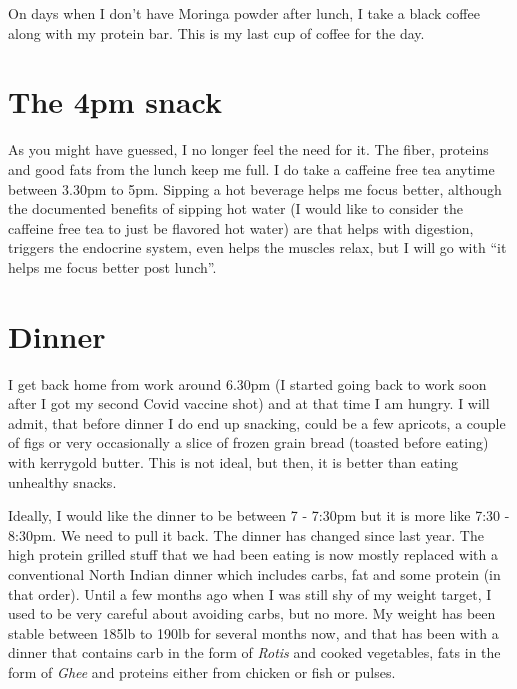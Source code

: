 \documentclass[
  oneside]{book}
\begin{document}
On days when I don't have Moringa powder after lunch, I take a black coffee along with my protein bar. This is my last cup of coffee for the day.

\hypertarget{the-4pm-snack-1}{%
\section{The 4pm snack}\label{the-4pm-snack-1}}

As you might have guessed, I no longer feel the need for it. The fiber, proteins and good fats from the lunch keep me full. I do take a caffeine free tea anytime between 3.30pm to 5pm. Sipping a hot beverage helps me focus better, although the documented benefits of sipping hot water (I would like to consider the caffeine free tea to just be flavored hot water) are that helps with digestion, triggers the endocrine system, even helps the muscles relax, but I will go with ``it helps me focus better post lunch''.

\hypertarget{dinner}{%
\section{Dinner}\label{dinner}}

I get back home from work around 6.30pm (I started going back to work soon after I got my second Covid vaccine shot) and at that time I am hungry. I will admit, that before dinner I do end up snacking, could be a few apricots, a couple of figs or very occasionally a slice of frozen grain bread (toasted before eating) with kerrygold butter. This is not ideal, but then, it is better than eating unhealthy snacks.

Ideally, I would like the dinner to be between 7 - 7:30pm but it is more like 7:30 - 8:30pm. We need to pull it back. The dinner has changed since last year. The high protein grilled stuff that we had been eating is now mostly replaced with a conventional North Indian dinner which includes carbs, fat and some protein (in that order). Until a few months ago when I was still shy of my weight target, I used to be very careful about avoiding carbs, but no more. My weight has been stable between 185lb to 190lb for several months now, and that has been with a dinner that contains carb in the form of \emph{Rotis} and cooked vegetables, fats in the form of \emph{Ghee} and proteins either from chicken or fish or pulses.
\end{document}
